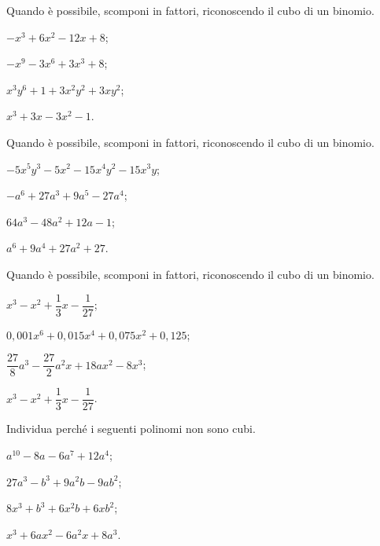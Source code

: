 \begin{esercizio}
\label{ese:13.39}
Quando è possibile, scomponi in fattori, riconoscendo il cubo di un binomio.
\begin{multicols}{2}
\begin{enumeratea}
 \item $-x^{3}+6x^{2}-12x+8$;
 \item $-x^{9}-3x^{6}+3x^{3}+8$;
 \item $x^{3}y^{6}+1+3x^{2}y^{2}+3xy^{2}$;
 \item $x^{3}+3x-3x^{2}-1$.
\end{enumeratea}
\end{multicols}
\end{esercizio}

\begin{esercizio}
\label{ese:13.40}
Quando è possibile, scomponi in fattori, riconoscendo il cubo di un binomio.
\begin{multicols}{2}
\begin{enumeratea}
 \item $-5x^{5}y^{3}-5x^{2}-15x^{4}y^{2}-15x^{3}y$;
 \item $-a^{6}+27a^{3}+9a^{5}-27a^{4}$;
 \item $64a^{3}-48a^{2}+12a-1$;
 \item $a^{6}+9a^{4}+27a^{2}+27$.
\end{enumeratea}
\end{multicols}
\end{esercizio}

\begin{esercizio}
\label{ese:13.41}
Quando è possibile, scomponi in fattori, riconoscendo il cubo di un binomio.
\begin{multicols}{2}
\begin{enumeratea}
 \item $x^{3}-x^{2}+\dfrac{1}{3}x-\dfrac{1}{27}$;
 \item $0,001x^{6}+0,015x^{4}+0,075x^{2}+0,125$;
 \item $\dfrac{27}{8}a^{3}-\dfrac{27}{2}a^{2}x+18ax^{2}-8x^{3}$;
 \item $x^{3}-x^{2}+\dfrac{1}{3}x-\dfrac{1}{27}$.
\end{enumeratea}
\end{multicols}
\end{esercizio}

\begin{esercizio}
\label{ese:13.42}
Individua perché i seguenti polinomi non sono cubi.
\begin{multicols}{2}
\begin{enumeratea}
 \item $a^{10}-8a-6a^{7}+12a^{4}$; %
 \item $27a^{3}-b^{3}+9a^{2}b-9ab^{2}$; %
 \item $8x^{3}+b^{3}+6x^{2}b+6{xb}^{2}$; %
 \item $x^{3}+6ax^{2}-6a^{2}x+8a^{3}$. %
\end{enumeratea}
\end{multicols}
\end{esercizio}

